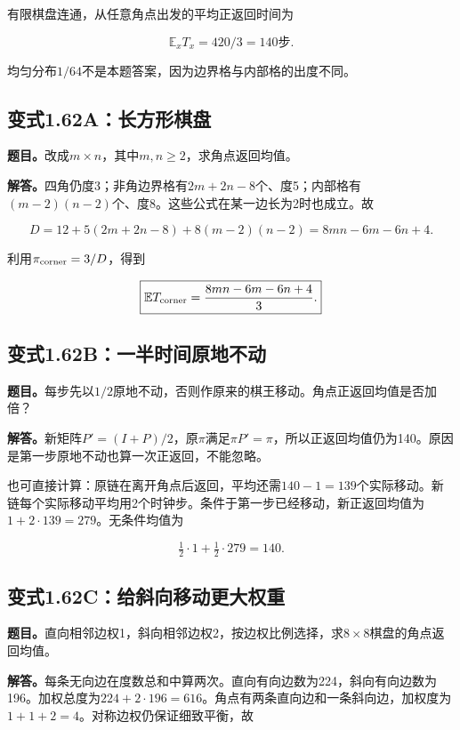 \documentclass[
  11pt,a4paper,UTF8,fontset=fandol]{ctexart}
\begin{document}
有限棋盘连通，从任意角点出发的平均正返回时间为

\[\boxed{\mathbb E_xT_x=420/3=140\text{步}.}\]

均匀分布\(1/64\)不是本题答案，因为边界格与内部格的出度不同。

\subsection{变式1.62A：长方形棋盘}\label{ux53d8ux5f0f1.62aux957fux65b9ux5f62ux68cbux76d8}

\textbf{题目。}改成\(m\times n\)，其中\(m,n\ge2\)，求角点返回均值。

\textbf{解答。}四角仍度3；非角边界格有\(2m+2n-8\)个、度5；内部格有\((m-2)(n-2)\)个、度8。这些公式在某一边长为2时也成立。故

\[D=12+5(2m+2n-8)+8(m-2)(n-2)=8mn-6m-6n+4.\]

利用\(\pi_{\rm corner}=3/D\)，得到

\[\boxed{\mathbb E T_{\rm corner}=\frac{8mn-6m-6n+4}{3}.}\]

\subsection{变式1.62B：一半时间原地不动}\label{ux53d8ux5f0f1.62bux4e00ux534aux65f6ux95f4ux539fux5730ux4e0dux52a8}

\textbf{题目。}每步先以\(1/2\)原地不动，否则作原来的棋王移动。角点正返回均值是否加倍？

\textbf{解答。}新矩阵\(P'=(I+P)/2\)，原\(\pi\)满足\(\pi P'=\pi\)，所以正返回均值仍为140。原因是第一步原地不动也算一次正返回，不能忽略。

也可直接计算：原链在离开角点后返回，平均还需\(140-1=139\)个实际移动。新链每个实际移动平均用2个时钟步。条件于第一步已经移动，新正返回均值为\(1+2\cdot139=279\)。无条件均值为

\[\tfrac12\cdot1+\tfrac12\cdot279=140.\]

\subsection{变式1.62C：给斜向移动更大权重}\label{ux53d8ux5f0f1.62cux7ed9ux659cux5411ux79fbux52a8ux66f4ux5927ux6743ux91cd}

\textbf{题目。}直向相邻边权1，斜向相邻边权2，按边权比例选择，求\(8\times8\)棋盘的角点返回均值。

\textbf{解答。}每条无向边在度数总和中算两次。直向有向边数为224，斜向有向边数为196。加权总度为\(224+2\cdot196=616\)。角点有两条直向边和一条斜向边，加权度为\(1+1+2=4\)。对称边权仍保证细致平衡，故
\end{document}
